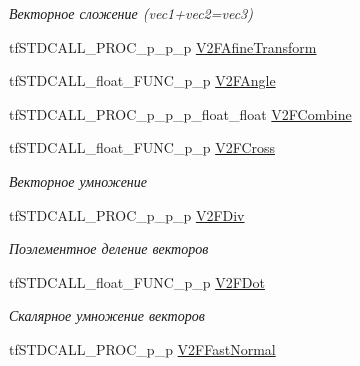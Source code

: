 \begin{DoxyCompactItemize}
\begin{DoxyCompactList}\small\item\em Векторное сложение (vec1+vec2=vec3) \end{DoxyCompactList}\item 
tf\-S\-T\-D\-C\-A\-L\-L\-\_\-\-P\-R\-O\-C\-\_\-p\-\_\-p\-\_\-p \hyperlink{structs_functions_vector_c_p_u_a0a2093c4242b8725ecaa12657ca2438a}{V2\-F\-Afine\-Transform}
\item 
tf\-S\-T\-D\-C\-A\-L\-L\-\_\-float\-\_\-\-F\-U\-N\-C\-\_\-p\-\_\-p \hyperlink{structs_functions_vector_c_p_u_ac436104131c5d264999c5512e0588227}{V2\-F\-Angle}
\item 
tf\-S\-T\-D\-C\-A\-L\-L\-\_\-\-P\-R\-O\-C\-\_\-p\-\_\-p\-\_\-p\-\_\-float\-\_\-float \hyperlink{structs_functions_vector_c_p_u_ab214e5f72b401c52ab1e685263239050}{V2\-F\-Combine}
\item 
\hypertarget{structs_functions_vector_c_p_u_a3726370d16e9047b34d927d79d1cfa13}{tf\-S\-T\-D\-C\-A\-L\-L\-\_\-float\-\_\-\-F\-U\-N\-C\-\_\-p\-\_\-p \hyperlink{structs_functions_vector_c_p_u_a3726370d16e9047b34d927d79d1cfa13}{V2\-F\-Cross}}\label{structs_functions_vector_c_p_u_a3726370d16e9047b34d927d79d1cfa13}

\begin{DoxyCompactList}\small\item\em Векторное умножение \end{DoxyCompactList}\item 
\hypertarget{structs_functions_vector_c_p_u_a86c9963f6dd2c85ae66c66633aa0c8d0}{tf\-S\-T\-D\-C\-A\-L\-L\-\_\-\-P\-R\-O\-C\-\_\-p\-\_\-p\-\_\-p \hyperlink{structs_functions_vector_c_p_u_a86c9963f6dd2c85ae66c66633aa0c8d0}{V2\-F\-Div}}\label{structs_functions_vector_c_p_u_a86c9963f6dd2c85ae66c66633aa0c8d0}

\begin{DoxyCompactList}\small\item\em Поэлементное деление векторов \end{DoxyCompactList}\item 
\hypertarget{structs_functions_vector_c_p_u_a41dc4fa99945721d3c3d8522edeb9516}{tf\-S\-T\-D\-C\-A\-L\-L\-\_\-float\-\_\-\-F\-U\-N\-C\-\_\-p\-\_\-p \hyperlink{structs_functions_vector_c_p_u_a41dc4fa99945721d3c3d8522edeb9516}{V2\-F\-Dot}}\label{structs_functions_vector_c_p_u_a41dc4fa99945721d3c3d8522edeb9516}

\begin{DoxyCompactList}\small\item\em Скалярное умножение векторов \end{DoxyCompactList}\item 
\hypertarget{structs_functions_vector_c_p_u_a3388542052179d2742d25d9a60dcad10}{tf\-S\-T\-D\-C\-A\-L\-L\-\_\-\-P\-R\-O\-C\-\_\-p\-\_\-p \hyperlink{structs_functions_vector_c_p_u_a3388542052179d2742d25d9a60dcad10}{V2\-F\-Fast\-Normal}}\label{structs_functions_vector_c_p_u_a3388542052179d2742d25d9a60dcad10}


\end{DoxyCompactItemize}
